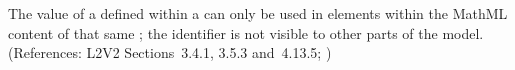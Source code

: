The  value of a \Parameter defined within a \KineticLaw
can only be used in  elements within the MathML content
of that same \KineticLaw; the identifier is not visible to other
parts of the model.  (References: L2V2 Sections~3.4.1, 3.5.3 
and~4.13.5; )
